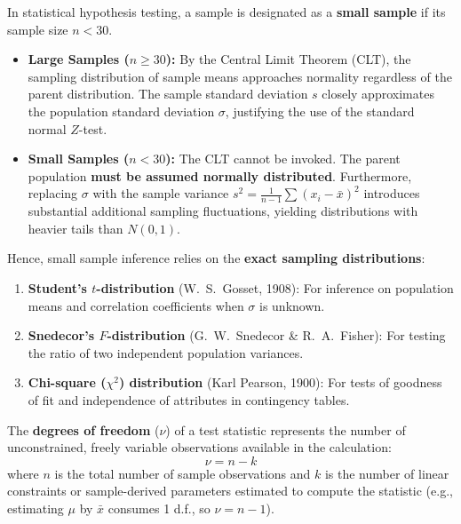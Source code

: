 \documentclass[12pt,a4paper]{article}
\begin{document}
\begin{tcolorbox}[defbox, title={\textbf{Definition: Small Samples vs. Large Samples}}]
In statistical hypothesis testing, a sample is designated as a \textbf{small sample} if its sample size $n < 30$.
\begin{itemize}[leftmargin=12pt, itemsep=2pt]
  \item \textbf{Large Samples ($n \ge 30$):} By the Central Limit Theorem (CLT), the sampling distribution of sample means approaches normality regardless of the parent distribution. The sample standard deviation $s$ closely approximates the population standard deviation $\sigma$, justifying the use of the standard normal $Z$-test.
  \item \textbf{Small Samples ($n < 30$):} The CLT cannot be invoked. The parent population \textbf{must be assumed normally distributed}. Furthermore, replacing $\sigma$ with the sample variance $s^2 = \frac{1}{n-1}\sum (x_i - \bar{x})^2$ introduces substantial additional sampling fluctuations, yielding distributions with heavier tails than $N(0, 1)$.
\end{itemize}
Hence, small sample inference relies on the \textbf{exact sampling distributions}:
\begin{enumerate}[leftmargin=16pt, itemsep=1pt]
  \item \textbf{Student's $t$-distribution} (W.~S.~Gosset, 1908): For inference on population means and correlation coefficients when $\sigma$ is unknown.
  \item \textbf{Snedecor's $F$-distribution} (G.~W.~Snedecor \& R.~A.~Fisher): For testing the ratio of two independent population variances.
  \item \textbf{Chi-square ($\chi^2$) distribution} (Karl Pearson, 1900): For tests of goodness of fit and independence of attributes in contingency tables.
\end{enumerate}
\end{tcolorbox}

\begin{tcolorbox}[formulabox, title={\textbf{Degrees of Freedom ($\nu$ or d.f.)}}]
The \textbf{degrees of freedom} ($\nu$) of a test statistic represents the number of unconstrained, freely variable observations available in the calculation:
\begin{equation}
  \nu = n - k
\end{equation}
where $n$ is the total number of sample observations and $k$ is the number of linear constraints or sample-derived parameters estimated to compute the statistic (e.g., estimating $\mu$ by $\bar{x}$ consumes 1 d.f., so $\nu = n - 1$).
\end{tcolorbox}
\end{document}
